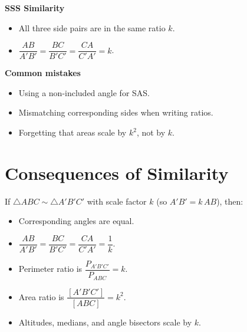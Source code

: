 \documentclass[11pt,a4paper]{article}
\begin{document}
\begin{multicols}{3}
\columnbreak

\begin{theorembox}
\textbf{SSS Similarity}
\begin{itemize}
  \item All three side pairs are in the same ratio $k$.
  \item $\dfrac{AB}{A'B'} = \dfrac{BC}{B'C'} = \dfrac{CA}{C'A'} = k$.
\end{itemize}
\begin{center}
\end{center}
\end{theorembox}
\end{multicols}

\begin{warningbox}
\textbf{Common mistakes}
\begin{itemize}
  \item Using a non-included angle for SAS.
  \item Mismatching corresponding sides when writing ratios.
  \item Forgetting that areas scale by $k^2$, not by $k$.
\end{itemize}
\end{warningbox}

\newpage

\section*{Consequences of Similarity}

\begin{propertybox}
If $\triangle ABC \sim \triangle A'B'C'$ with scale factor $k$ (so $A'B' = k\,AB$), then:
\begin{itemize}
  \item Corresponding angles are equal.
  \item $\dfrac{AB}{A'B'} = \dfrac{BC}{B'C'} = \dfrac{CA}{C'A'} = \dfrac{1}{k}$.
  \item Perimeter ratio is $\dfrac{P_{A'B'C'}}{P_{ABC}} = k$.
  \item Area ratio is $\dfrac{[A'B'C']}{[ABC]} = k^2$.
  \item Altitudes, medians, and angle bisectors scale by $k$.
\end{itemize}
\end{propertybox}
\end{document}
